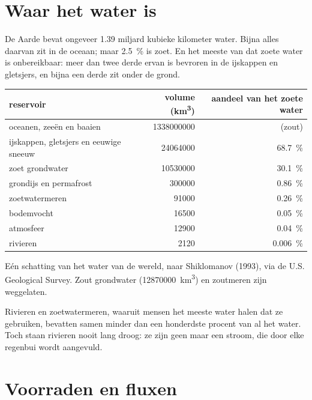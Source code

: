 \section{Waar het water is}

De Aarde bevat ongeveer 1.39 miljard kubieke kilometer water. Bijna alles daarvan
zit in de oceaan; maar \qty{2.5}{\percent} is zoet. En het meeste van dat zoete
water is onbereikbaar: meer dan twee derde ervan is bevroren in de ijskappen en
gletsjers, en bijna een derde zit onder de grond.

\begin{center}
\small
\begin{tabular}{|l|r|r|}
\hline
\textbf{reservoir} & \textbf{volume (\unit{km^3})} & \textbf{aandeel van het zoete water} \\ \hline
oceanen, zeeën en baaien & \num{1338000000} & (zout) \\ \hline
ijskappen, gletsjers en eeuwige sneeuw & \num{24064000} & \qty{68.7}{\percent} \\ \hline
zoet grondwater & \num{10530000} & \qty{30.1}{\percent} \\ \hline
grondijs en permafrost & \num{300000} & \qty{0.86}{\percent} \\ \hline
zoetwatermeren & \num{91000} & \qty{0.26}{\percent} \\ \hline
bodemvocht & \num{16500} & \qty{0.05}{\percent} \\ \hline
atmosfeer & \num{12900} & \qty{0.04}{\percent} \\ \hline
rivieren & \num{2120} & \qty{0.006}{\percent} \\ \hline
\end{tabular}

{\small Eén schatting van het water van de wereld, naar Shiklomanov (1993), via de
U.S. Geological Survey. Zout grondwater (\num{12870000}~\unit{km^3}) en
zoutmeren zijn weggelaten.}
\end{center}

Rivieren en zoetwatermeren, waaruit mensen het meeste water halen dat ze
gebruiken, bevatten samen minder dan een honderdste procent van al het water.
Toch staan rivieren nooit lang droog: ze zijn geen  maar een stroom, die
door elke regenbui wordt aangevuld.

\section{Voorraden en fluxen}

